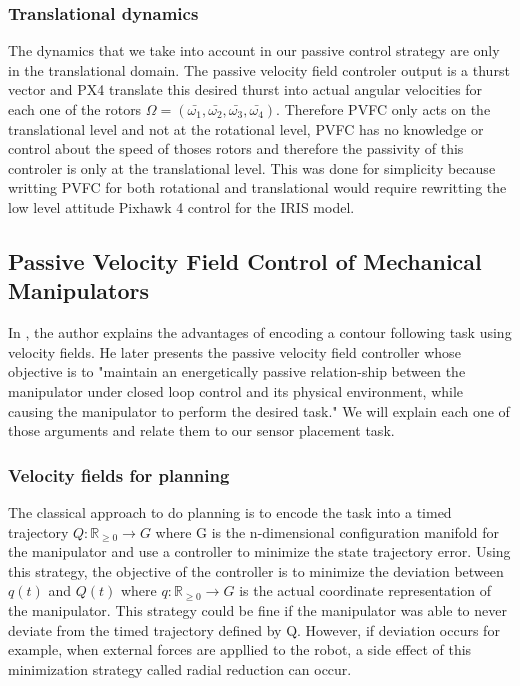\subsubsection{Translational dynamics}

The dynamics that we take into account in our passive control strategy are only in the translational domain. The passive velocity field controler output is a thurst vector and PX4 translate this desired thurst into actual angular velocities for each one of the rotors 
$\Omega = (\bar{\omega_1}, \bar{\omega_2}, \bar{\omega_3}, \bar{\omega_4})$. Therefore PVFC only acts on the translational level and not at the rotational level, PVFC has no knowledge or control about the speed of thoses rotors and therefore the passivity of this controler is only at the translational level. 
This was done for simplicity because writting PVFC for both rotational and translational would require rewritting the low level attitude Pixhawk 4 control for the IRIS model. 

\subsection{Passive Velocity Field Control of Mechanical Manipulators}
In \cite{li1999passive}, the author explains the advantages of encoding a contour following task using velocity fields. 
He later presents the passive velocity field controller whose objective is to "maintain an energetically passive relation-ship between the manipulator under closed loop control and
its physical environment, while causing the manipulator to perform the desired task." 
We will explain each one of those arguments and relate them to our sensor placement task.
\subsubsection{Velocity fields for planning}
The classical approach to do planning is to encode the task into a timed trajectory $Q:\mathbb R_{\ge 0} \rightarrow G$ where G is the n-dimensional configuration manifold for the manipulator and use a controller to minimize the state trajectory error.
Using this strategy, the objective of the controller is to minimize the deviation between $q(t)$ and $Q(t)$ where $q:\mathbb R_{\ge 0} \rightarrow G$ is the actual coordinate representation of the manipulator.
This strategy could be fine if the manipulator was able to never deviate from the timed trajectory defined by Q. However, if deviation occurs for example, when external forces are appllied to the
robot, a side effect of this minimization strategy called radial reduction can occur.

